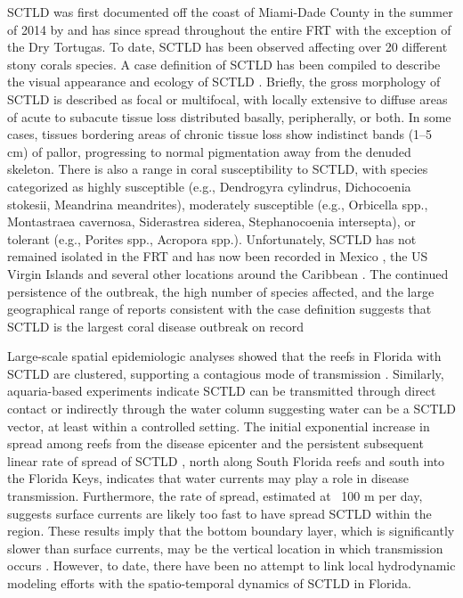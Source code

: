 \documentclass[utf8]{frontiersSCNS}
\begin{document}
SCTLD was first documented off the coast of Miami-Dade County in the summer of 2014 by \cite{precht2016unprecedented} and has since spread throughout the entire FRT with the exception of the Dry Tortugas. To date, SCTLD has been observed affecting over 20 different stony corals species. A case definition of SCTLD has been compiled to describe the visual appearance and ecology of SCTLD \citep{noaa2018}. Briefly, the gross morphology of SCTLD is described as focal or multifocal, with locally extensive to diffuse areas of acute to subacute tissue loss distributed basally, peripherally, or both. In some cases, tissues bordering areas of chronic tissue loss show indistinct bands (1–5 cm) of pallor, progressing to normal pigmentation away from the denuded skeleton. There is also a range in coral susceptibility to SCTLD, with species categorized as highly susceptible (e.g., Dendrogyra cylindrus, Dichocoenia stokesii, Meandrina meandrites), moderately susceptible (e.g., Orbicella spp., Montastraea cavernosa, Siderastrea siderea, Stephanocoenia intersepta), or tolerant (e.g., Porites spp., Acropora spp.). Unfortunately, SCTLD has not remained isolated in the FRT and has now been recorded in Mexico \citep{alvarez2019rapid}, the US Virgin Islands \citep{blondeau2020coral} and several other locations around the Caribbean \citep{kramer2019map}. The continued persistence of the outbreak, the high number of species affected, and the large geographical range of reports consistent with the case definition suggests that SCTLD is the largest coral disease outbreak on record 

Large-scale spatial epidemiologic analyses showed that the reefs in Florida with SCTLD are clustered, supporting a contagious mode of transmission \citep{muller2020spatial}. Similarly, aquaria-based experiments indicate SCTLD can be transmitted through direct contact or indirectly through the water column \citep{aeby2019pathogenesis} suggesting water can be a SCTLD vector, at least within a controlled setting. The initial exponential increase in spread among reefs from the disease epicenter \citep{precht2016unprecedented} and the persistent subsequent linear rate of spread of SCTLD \citep{muller2020spatial}, north along South Florida reefs and south into the Florida Keys, indicates that water currents may play a role in disease transmission. Furthermore, the rate of spread, estimated at ~100 m per day, suggests surface currents are likely too fast to have spread SCTLD within the region. These results imply that the bottom boundary layer, which is significantly slower than surface currents, may be the vertical location in which transmission occurs \citep{aeby2019pathogenesis}. However, to date, there have been no attempt to link local hydrodynamic modeling efforts with the spatio-temporal dynamics of SCTLD in Florida.
\end{document}
